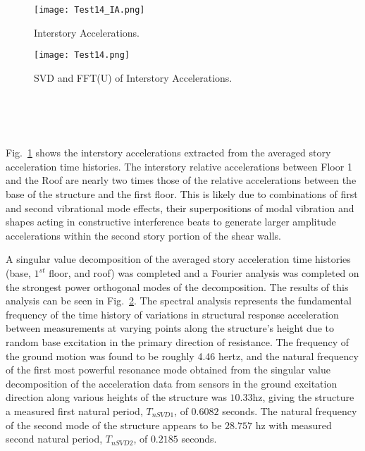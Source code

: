 \documentclass{article}
\begin{document}
\begin{figure}[]
    \texttt{[image: Test14\_IA.png]}
    \caption{Interstory Accelerations.}
    \label{fig:SVDFFT_IA}
\end{figure}
\begin{figure}[h]
    \texttt{[image: Test14.png]}
    \caption{SVD and FFT(U) of Interstory Accelerations.}
    \label{fig:SVDFFT_fin}
\end{figure}
\FloatBarrier
\\
\\
\\
\par
Fig.\  \ref{fig:SVDFFT_IA} shows the interstory accelerations extracted from the averaged story acceleration time histories. The interstory relative accelerations between Floor 1 and the Roof are nearly two times those of the relative accelerations between the base of the structure and the first floor. This is likely due to combinations of first and second vibrational mode effects, their superpositions of modal vibration and shapes acting in constructive interference beats to generate larger amplitude accelerations within the second story portion of the shear walls. 

\medskip

\par A singular value decomposition of the averaged story acceleration time histories (base, $1^{st}$ floor, and roof) was completed and a Fourier analysis was completed on the strongest power orthogonal modes of the decomposition. The results of this analysis can be seen in Fig.\  \ref{fig:SVDFFT_fin}. 
The spectral analysis represents the fundamental frequency of the time history of variations in structural response acceleration between measurements at varying points along the structure's height due to random base excitation in the primary direction of resistance. The frequency of the ground motion was found to be roughly 4.46 hertz, and the natural frequency of the first most powerful resonance mode obtained from the singular value decomposition of the acceleration data from sensors in the ground excitation direction along various heights of the structure was $10.33 $hz, giving the structure a measured first natural period, $T_{nSVD1}$, of $0.6082$ seconds. 
The natural frequency of the second mode of the structure appears to be $28.757$ hz with measured second natural period, $T_{nSVD2}$, of $0.2185$ seconds. 

\medskip
\end{document}
